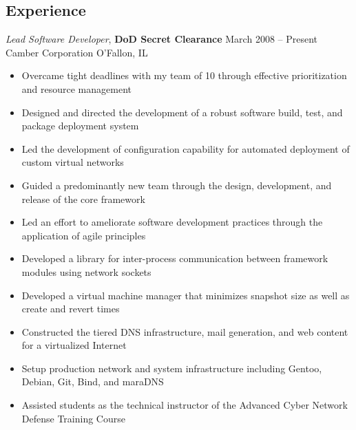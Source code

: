 \documentclass[margin,line]{resume}
\begin{document}
\begin{resume}
\section{Experience}

{\sl Lead Software Developer}, \textbf{\small DoD Secret Clearance}   \hfill  March 2008 -- Present\\
Camber Corporation                                                    \hfill  O'Fallon, IL
\begin{itemize} \itemsep -2pt %
\small\item Overcame tight deadlines with my team of 10 through effective prioritization and resource management
\small\item Designed and directed the development of a robust software build, test, and package deployment system
\small\item Led the development of configuration capability for automated deployment of custom virtual networks
\small\item Guided a predominantly new team through the design, development, and release of the core framework
\small\item Led an effort to ameliorate software development practices through the application of agile principles
\small\item Developed a library for inter-process communication between framework modules using network sockets
\small\item Developed a virtual machine manager that minimizes snapshot size as well as create and revert times
\small\item Constructed the tiered DNS infrastructure, mail generation, and web content for a virtualized Internet
\small\item Setup production network and system infrastructure including Gentoo, Debian, Git, Bind, and maraDNS
\small\item Assisted students as the technical instructor of the Advanced Cyber Network Defense Training Course


\end{itemize}
\end{resume}
\end{document}
